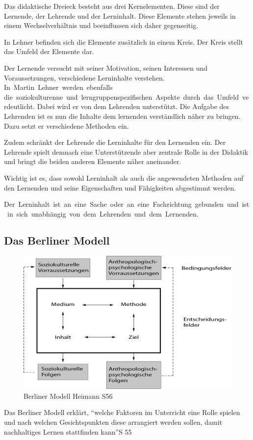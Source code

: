 Das didaktische Dreieck besteht aus drei Kernelementen. Diese sind der Lernende, der Lehrende und der Lerninhalt. Diese Elemente stehen jeweils in einem Wechselverhältnis und beeinflussen sich daher gegenseitig. 

In Lehner befinden sich die Elemente zusätzlich in einem Kreis. Der Kreis stellt das Umfeld der Elemente dar. 

Der Lernende versucht mit seiner Motivation, seinen Interessen und Voraussetzungen, verschiedene Lerninhalte verstehen. In Martin Lehner werden ebenfalls die soziokulturenne und lerngruppenspezifischen Aspekte durch das Umfeld verdeutlicht.
 Dabei wird er von dem Lehrenden unterstützt. Die Aufgabe des Lehrenden ist es nun die Inhalte dem lernenden verständlich näher zu bringen. Dazu setzt er verschiedene Methoden ein. 

Zudem schränkt der Lehrende die Lerninhalte für den Lernenden ein. Der Lehrende spielt demnach eine Unterstützende aber zentrale Rolle in der Didaktik und bringt die beiden anderen Elemente näher aneinander.

Wichtig ist es, dass sowohl Lerninhalt als auch die angewendeten Methoden auf den Lernenden und seine Eigenschaften und Fähigkeiten abgestimmt werden. 

Der Lerninhalt ist an eine Sache oder an eine Fachrichtung gebunden und ist in sich unabhängig von dem Lehrenden und dem Lernenden.\autocite{Lehner.2019}

\subsection{Das Berliner Modell}
\begin{figure}[h]
    \centering
    \includegraphics[width=1\textwidth]{img/berlinerModell.png}
    \caption[Grafik: \ac{Berliner Modell}]{Berliner Modell Heimann S56}
    \label{fig:Berliner_Modell}
\end{figure}  
Das Berliner Modell erklärt, \enquote{welche Faktoren im Unterricht eine Rolle spielen und nach welchen Gesichtspunkten diese arrangiert werden sollen, damit nachhaltiges Lernen stattfinden kann}S 55

